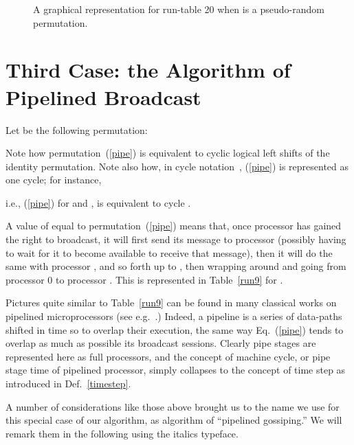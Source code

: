 \documentclass{elsart}
\begin{document}
\begin{figure}
\centerline{}
\caption{A graphical representation for run-table 20 when  is
a pseudo-random permutation.}\label{r20}
\end{figure}

\section{Third Case: the Algorithm of Pipelined Broadcast}\label{tao-pb}
Let  be the following permutation:


Note how permutation~(\ref{pipe}) is equivalent to  
cyclic logical left shifts of the identity permutation. Note also how,
in cycle notation~\cite{Knu73a}, (\ref{pipe}) is represented as one cycle;
for instance,



i.e., (\ref{pipe}) for  and , is equivalent to cycle .

A value of  equal to permutation~(\ref{pipe}) means that, once processor  
has gained the right to broadcast,
it will first send its message to processor 
(possibly having to wait for it to become available to receive that message),
then it will do the same with processor , and so
forth up to , then wrapping around and going from processor 0 to processor .
This is represented in Table~\ref{run9} for .

Pictures quite similar to Table~\ref{run9} can be found in many classical works
on pipelined microprocessors (see e.g.~\cite[p.132--133]{PaHe96}.)
Indeed, a pipeline is a series of data-paths shifted in time so to overlap
their execution, the same way Eq.~(\ref{pipe}) tends to overlap
as much as possible its broadcast sessions. Clearly pipe stages are represented
here as full processors, and the concept of machine cycle, or pipe stage time
of pipelined processor, simply collapses to the concept of time step as
introduced in Def.~\ref{timestep}.

A number of considerations like those above brought us to the name
we use for this special case of our algorithm, as algorithm of
``pipelined gossiping.'' We will remark them in the following
using the italics typeface.
\end{document}
